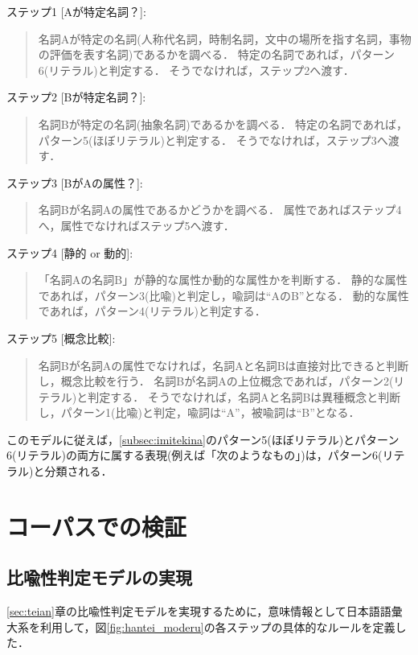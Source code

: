 \medskip
ステップ1 [Aが特定名詞？]:
\begin{quote}
名詞Aが特定の名詞(人称代名詞，時制名詞，文中の場所を指す名詞，事物の評価を表す名詞)であるかを調べる．
特定の名詞であれば，パターン6(リテラル)と判定する．
そうでなければ，ステップ2へ渡す．
\end{quote}

\medskip
ステップ2 [Bが特定名詞？]:
\begin{quote}
名詞Bが特定の名詞(抽象名詞)であるかを調べる．
特定の名詞であれば，パターン5(ほぼリテラル)と判定する．
そうでなければ，ステップ3へ渡す．
\end{quote}

\medskip
ステップ3 [BがAの属性？]:
\begin{quote}
名詞Bが名詞Aの属性であるかどうかを調べる．
属性であればステップ4へ，属性でなければステップ5へ渡す．
\end{quote}

\medskip
ステップ4 [静的 or 動的]:
\begin{quote}
「名詞Aの名詞B」が静的な属性か動的な属性かを判断する．
静的な属性であれば，パターン3(比喩)と判定し，喩詞は``AのB''となる．
動的な属性であれば，パターン4(リテラル)と判定する．
\end{quote}

\medskip
ステップ5 [概念比較]:
\begin{quote}
名詞Bが名詞Aの属性でなければ，名詞Aと名詞Bは直接対比できると判断し，概念比較を行う．
名詞Bが名詞Aの上位概念であれば，パターン2(リテラル)と判定する．
そうでなければ，名詞Aと名詞Bは異種概念と判断し，パターン1(比喩)と判定，喩詞は``A''，被喩詞は``B''となる．
\end{quote}

\medskip
このモデルに従えば，\ref{subsec:imitekina}のパターン5(ほぼリテラル)とパターン6(リテラル)の両方に属する表現(例えば「次のようなもの」)は，パターン6(リテラル)と分類される．

\section{コーパスでの検証}\label{sec:ko-pasu}

\subsection{比喩性判定モデルの実現}\label{subsec:jitugen}

\ref{sec:teian}章の比喩性判定モデルを実現するために，意味情報として日本語語彙大系\cite{NTT-1}を利用して，図\ref{fig:hantei_moderu}の各ステップの具体的なルールを定義した．

